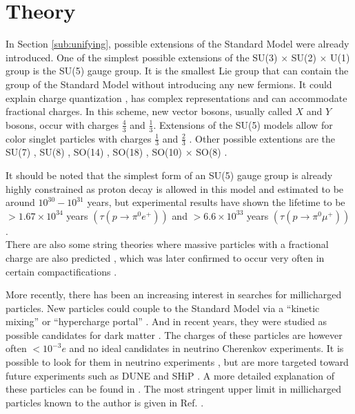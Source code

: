 \section{Theory}
In Section \ref{sub:unifying}, possible extensions of the Standard Model were already introduced. One of the simplest possible extensions of the SU(3) $\times$ SU(2) $\times$ U(1) group is the SU(5) gauge group. It is the smallest Lie group that can contain the group of the Standard Model without introducing any new fermions. It could explain charge quantization \cite{He:1989eq}, has complex representations and can accommodate fractional charges. In this scheme, new vector bosons, usually called $X$ and $Y$ bosons, occur with charges $\frac{4}{3}$ and $\frac{1}{3}$. Extensions of the SU(5) models allow for color singlet particles with charges $\frac{1}{3}$ and $\frac{2}{3}$ \cite{Barr:1982vj}. Other possible extentions are the SU(7) \cite{Frampton:1982gc}, SU(8) \cite{Yu:1984pb}, SO(14) \cite{Yamamoto:1982sk}, SO(18) \cite{Dong:1983nh}, SO(10) $\times$ SO(8) \cite{Jiang:1985jy}. 

It should be noted that the simplest form of an SU(5) gauge group is already highly constrained as proton decay is allowed in this model and estimated to be around $10^{30}-10^{31}$ years, but experimental results have shown the lifetime to be $>1.67 \times 10^{34}$ years $\left(\tau\left(p \rightarrow \pi^0 e^+\right)\right)$ \cite{Bajc:2016qcc} and $>6.6 \times 10^{33}$ years $\left(\tau\left(p \rightarrow \pi^0 \mu^+\right)\right)$ \cite{Nishino:2009aa}.\\
\newline
There are also some string theories where massive particles with a fractional charge are also predicted \cite{Wen:1985qj,Antoniadis:1992eb}, which was later confirmed to occur very often in certain compactifications \cite{Athanasiu:1988uj}.

More recently, there has been an increasing interest in searches for millicharged particles. New particles could couple to the Standard Model via a ``kinetic mixing'' or ``hypercharge portal'' \cite{Holdom:1985ag,Izaguirre:2015eya}. And in recent years, they were studied as possible candidates for dark matter \cite{Brahm:1989jh,Boehm:2003hm,Pospelov:2007mp,Bjorken:2009mm}. The charges of these particles are however often $<10^{-3}e$ and no ideal candidates in neutrino Cherenkov experiments. It is possible to look for them in neutrino experiments \cite{Magill:2018tbb}, but are more targeted toward future experiments such as DUNE \cite{Acciarri:2015uup} and SHiP \cite{Anelli:2015pba}. A more detailed explanation of these particles can be found in \cite{Battaglieri:2017aum}. The most stringent upper limit in millicharged particles known to the author is given in Ref. \cite{Alvis:2018yte}.

